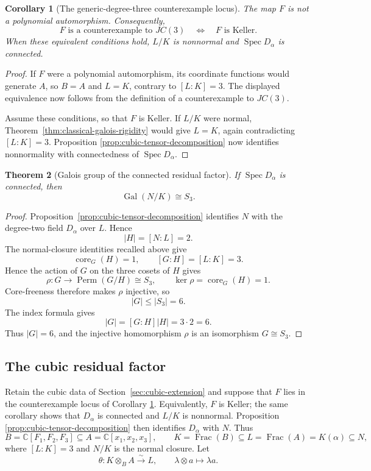 \documentclass[11pt]{article}
\newtheorem{theorem}{Theorem}[section]
\newtheorem{corollary}[theorem]{Corollary}
\theoremstyle{remark}
\theoremstyle{definition}
\DeclareMathOperator{\Spec}{Spec}
\DeclareMathOperator{\Frac}{Frac}
\DeclareMathOperator{\Gal}{Gal}
\DeclareMathOperator{\core}{core}
\newcommand{\C}{\mathbb C}
\begin{document}
\begin{corollary}[The generic-degree-three counterexample locus]
\label{cor:cubic-counterexample-locus}
The map \(F\) is not a polynomial automorphism.  Consequently,
\[
  F\text{ is a counterexample to }JC(3)
  \quad\Longleftrightarrow\quad
  F\text{ is Keller}.
\]
When these equivalent conditions hold, \(L/K\) is nonnormal and
\(\Spec D_\alpha\) is connected.
\end{corollary}

\begin{proof}
If \(F\) were a polynomial automorphism, its coordinate functions would
generate \(A\), so \(B=A\) and \(L=K\), contrary to \([L:K]=3\).
The displayed equivalence now follows from the definition of a
counterexample to \(JC(3)\).

Assume these conditions, so that \(F\) is Keller.  If \(L/K\) were
normal, Theorem~\ref{thm:classical-galois-rigidity} would give \(L=K\),
again contradicting \([L:K]=3\).  Proposition
\ref{prop:cubic-tensor-decomposition} now identifies nonnormality with
connectedness of \(\Spec D_\alpha\).
\end{proof}

\begin{theorem}[Galois group of the connected residual factor]
\label{thm:index-three-core-free-s3}
If \(\Spec D_\alpha\) is connected, then
\[
  \Gal(N/K)\cong S_3.
\]
\end{theorem}

\begin{proof}
Proposition~\ref{prop:cubic-tensor-decomposition} identifies \(N\) with
the degree-two field \(D_\alpha\) over \(L\).  Hence
\[
  |H|=[N:L]=2.
\]
The normal-closure identities recalled above give
\[
  \core_G(H)=1,
  \qquad
  [G:H]=[L:K]=3.
\]
Hence the action of \(G\) on the three cosets of \(H\) gives
\[
  \rho\colon G\longrightarrow\operatorname{Perm}(G/H)\cong S_3,
  \qquad
  \ker\rho=\core_G(H)=1.
\]
Core-freeness therefore makes \(\rho\) injective, so
\[
  |G|\leq |S_3|=6.
\]
The index formula gives
\[
  |G|=[G:H]|H|=3\cdot2=6.
\]
Thus \(|G|=6\), and the injective homomorphism \(\rho\) is an
isomorphism \(G\cong S_3\).
\end{proof}

\subsection{The cubic residual factor}

Retain the cubic data of Section~\ref{sec:cubic-extension} and suppose
that \(F\) lies in the counterexample locus of Corollary
\ref{cor:cubic-counterexample-locus}.  Equivalently, \(F\) is Keller;
the same corollary shows that \(D_\alpha\) is connected and \(L/K\) is
nonnormal.  Proposition
\ref{prop:cubic-tensor-decomposition} then identifies \(D_\alpha\) with
\(N\).  Thus
\[
  B=\C[F_1,F_2,F_3]\subseteq A=\C[x_1,x_2,x_3],
  \qquad
  K=\Frac(B)\subseteq L=\Frac(A)=K(\alpha)\subseteq N,
\]
where \([L:K]=3\) and \(N/K\) is the normal closure.  Let
\[
  \theta\colon K\otimes_BA\xrightarrow{\sim}L,
  \qquad
  \lambda\otimes a\longmapsto\lambda a.
\]
\end{document}
